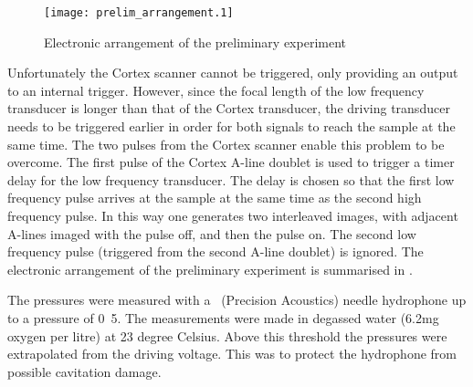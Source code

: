 \begin{figure}[h]
     \centering
          \texttt{[image: prelim\_arrangement.1]}
     \caption{Electronic arrangement of the preliminary experiment}
          \label{fig:exp:prelim:arrangement}
\end{figure}



Unfortunately the Cortex scanner cannot be triggered,
only providing an output to an internal trigger.
However, since the focal length of the low frequency transducer is longer than that
of the Cortex transducer,
the driving transducer needs to be triggered earlier in order for
both signals to reach the sample at the same time.
%
The two pulses from the Cortex scanner enable this problem to be overcome.
The first pulse of the Cortex A-line doublet is used to trigger 
a timer delay for the low frequency transducer.
The delay is chosen  so that the first low frequency pulse arrives at the
sample at the same time as the second high frequency pulse.
In this way one  generates two interleaved images, with adjacent A-lines
imaged with the pulse off, and then the pulse on.
The second low frequency pulse  (triggered from the second
A-line doublet) is ignored.
The electronic arrangement of the preliminary experiment is summarised in .

The pressures were measured with a \hydrophone\ (Precision Acoustics) needle hydrophone up to a pressure of 
\unit{0.5}\mega\pascal.  
The measurements were made in degassed water (6.2mg oxygen per litre) at 23 degree Celsius.
Above this threshold the pressures were extrapolated from the driving voltage.  
This was to protect the hydrophone from possible cavitation damage.




